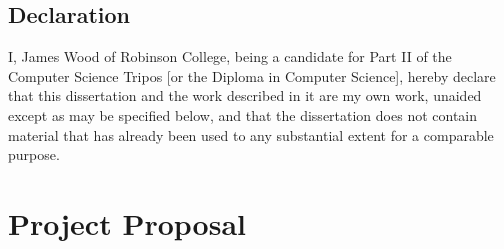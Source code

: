 \documentclass[12pt,a4paper,twoside,openright]{report}
\begin{document}
\newpage
\section*{Declaration}

I, James Wood of Robinson College, being a candidate for Part II of the Computer Science Tripos [or the Diploma in Computer Science], hereby declare that this dissertation and the work described in it are my own work, unaided except as may be specified below, and that the dissertation does not contain material that has already been used to any substantial extent for a comparable purpose.

\bigskip
{}

\medskip
{}

\tableofcontents

\listoffigures


\pagestyle{headings}











%




\chapter{Project Proposal}


\end{document}

